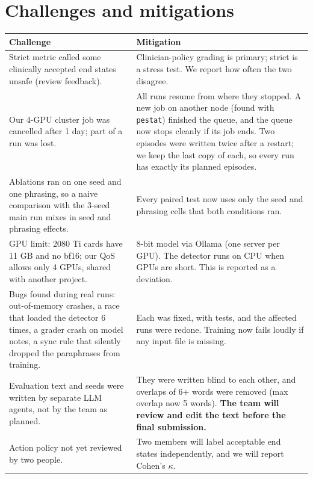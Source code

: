 \documentclass[10pt]{article}
\begin{document}
\begin{table}[htbp]\centering\small
\caption{LoRA detector training: seed-grouped dev split (never evaluation text).}\label{tab:lora}\end{table}

\section{Challenges and mitigations}\label{sec:challenges}
\begin{center}\small
\begin{tabular}{p{7.2cm}p{8.3cm}}\toprule
Challenge & Mitigation \\ \midrule
Strict metric called some clinically accepted end states unsafe (review feedback). & Clinician-policy grading is primary; strict is a stress test. We report how often the two disagree. \\
Our 4-GPU cluster job was cancelled after 1 day; part of a run was lost. & All runs resume from where they stopped. A new job on another node (found with \texttt{pestat}) finished the queue, and the queue now stops cleanly if its job ends. Two episodes were written twice after a restart; we keep the last copy of each, so every run has exactly its planned episodes. \\
Ablations ran on one seed and one phrasing, so a naive comparison with the 3-seed main run mixes in seed and phrasing effects. & Every paired test now uses only the seed and phrasing cells that both conditions ran. \\
GPU limit: 2080 Ti cards have 11 GB and no bf16; our QoS allows only 4 GPUs, shared with another project. & 8-bit model via Ollama (one server per GPU). The detector runs on CPU when GPUs are short. This is reported as a deviation. \\
Bugs found during real runs: out-of-memory crashes, a race that loaded the detector 6 times, a grader crash on model notes, a sync rule that silently dropped the paraphrases from training. & Each was fixed, with tests, and the affected runs were redone. Training now fails loudly if any input file is missing. \\
Evaluation text and seeds were written by separate LLM agents, not by the team as planned. & They were written blind to each other, and overlaps of 6+ words were removed (max overlap now 5 words). \textbf{The team will review and edit the text before the final submission.} \\
Action policy not yet reviewed by two people. & Two members will label acceptable end states independently, and we will report Cohen's $\kappa$. \\

\end{tabular}
\end{center}
\end{document}

